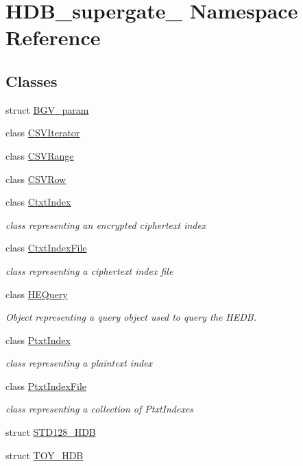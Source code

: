 \hypertarget{namespaceHDB__supergate__}{}\section{H\+D\+B\+\_\+supergate\+\_\+ Namespace Reference}
\label{namespaceHDB__supergate__}
\subsection*{Classes}
\begin{DoxyCompactItemize}
\item 
struct \hyperlink{structHDB__supergate___1_1BGV__param}{B\+G\+V\+\_\+param}
\item 
class \hyperlink{classHDB__supergate___1_1CSVIterator}{C\+S\+V\+Iterator}
\item 
class \hyperlink{classHDB__supergate___1_1CSVRange}{C\+S\+V\+Range}
\item 
class \hyperlink{classHDB__supergate___1_1CSVRow}{C\+S\+V\+Row}
\item 
class \hyperlink{classHDB__supergate___1_1CtxtIndex}{Ctxt\+Index}
\begin{DoxyCompactList}\small\item\em class representing an encrypted ciphertext index \end{DoxyCompactList}\item 
class \hyperlink{classHDB__supergate___1_1CtxtIndexFile}{Ctxt\+Index\+File}
\begin{DoxyCompactList}\small\item\em class representing a ciphertext index file \end{DoxyCompactList}\item 
class \hyperlink{classHDB__supergate___1_1HEQuery}{H\+E\+Query}
\begin{DoxyCompactList}\small\item\em Object representing a query object used to query the H\+E\+DB. \end{DoxyCompactList}\item 
class \hyperlink{classHDB__supergate___1_1PtxtIndex}{Ptxt\+Index}
\begin{DoxyCompactList}\small\item\em class representing a plaintext index \end{DoxyCompactList}\item 
class \hyperlink{classHDB__supergate___1_1PtxtIndexFile}{Ptxt\+Index\+File}
\begin{DoxyCompactList}\small\item\em class representing a collection of Ptxt\+Indexes \end{DoxyCompactList}\item 
struct \hyperlink{structHDB__supergate___1_1STD128__HDB}{S\+T\+D128\+\_\+\+H\+DB}
\item 
struct \hyperlink{structHDB__supergate___1_1TOY__HDB}{T\+O\+Y\+\_\+\+H\+DB}
\end{DoxyCompactItemize}

